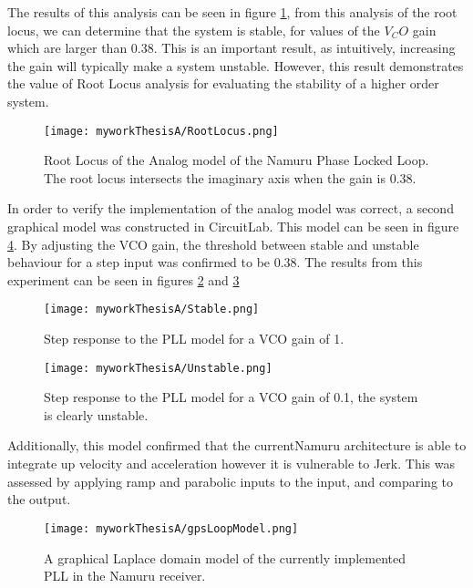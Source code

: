 The results of this analysis can be seen in figure \ref{fig:RootLocus}, from this analysis of the root locus, we can determine  that the system is stable, for values of the $V_CO$ gain which are larger than 0.38. This is an important result, as intuitively, increasing the gain will typically make a system unstable. However, this result demonstrates the value of Root Locus analysis for evaluating the stability of a higher order system.

\begin{figure}[!htb] 
    \centering
    \texttt{[image: myworkThesisA/RootLocus.png]} 
    \caption{Root Locus of the Analog model of the Namuru Phase Locked Loop. The root locus intersects the imaginary axis when the gain is 0.38.}
    \label{fig:RootLocus}
\end{figure}


In order to verify the implementation of the analog model was correct, a second graphical model was constructed in CircuitLab. This model can be seen in figure \ref{fig:gpsLoopModel}. By adjusting the VCO gain, the threshold between stable and unstable behaviour for a step input was confirmed to be 0.38. The results from this experiment can be seen in figures \ref{fig:Stable} and \ref{fig:Unstable}

\begin{figure}[!htb] 
    \centering
    \texttt{[image: myworkThesisA/Stable.png]} 
    \caption{Step response to the \ac{PLL} model for a VCO gain of 1.}
    \label{fig:Stable}
\end{figure}

\begin{figure}[!htb] 
    \centering
    \texttt{[image: myworkThesisA/Unstable.png]} 
    \caption{Step response to the \ac{PLL} model for a VCO gain of 0.1, the system is clearly unstable.}
    \label{fig:Unstable}
\end{figure}

Additionally, this model confirmed that the currentNamuru architecture is able to integrate up velocity and acceleration however it is vulnerable to Jerk. This was assessed by applying ramp and parabolic inputs to the input, and comparing to the output.

\begin{figure}[!htb] 
    \centering
    \texttt{[image: myworkThesisA/gpsLoopModel.png]} 
    \caption{A graphical Laplace domain model of the currently implemented \ac{PLL} in the Namuru receiver.}
    \label{fig:gpsLoopModel}
\end{figure}

